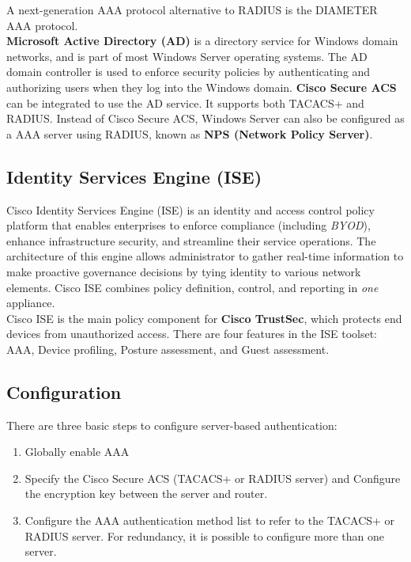 \tableEnd

\note A next-generation AAA protocol alternative to RADIUS is the DIAMETER AAA protocol.\\

\textbf{Microsoft Active Directory (AD)} is a directory service for Windows domain networks, and is part of most Windows Server operating systems. The AD domain controller is used to enforce security policies by authenticating and authorizing users when they log into the Windows domain. \textbf{Cisco Secure ACS} can be integrated to use the AD service. It supports both TACACS+ and RADIUS. Instead of Cisco Secure ACS, Windows Server can also be configured as a AAA server using RADIUS, known as \textbf{NPS (Network Policy Server)}.

\subsection{Identity Services Engine (ISE)}

Cisco Identity Services Engine (ISE) is an identity and access control policy platform that enables enterprises to enforce compliance (including \emph{BYOD}), enhance infrastructure security, and streamline their service operations. The architecture of this engine allows administrator to gather real-time information to make proactive governance decisions by tying identity to various network elements. Cisco ISE combines policy definition, control, and reporting in \emph{one} appliance.\\

Cisco ISE is the main policy component for \textbf{Cisco TrustSec}, which protects end devices from unauthorized access. There are four features in the ISE toolset: AAA, Device profiling, Posture assessment, and Guest assessment.

\subsection{Configuration}

There are three basic steps to configure server-based authentication:

\begin{enumerate}
\item Globally enable AAA
\item Specify the Cisco Secure ACS (TACACS+ or RADIUS server) and Configure the encryption key between the server and router.
\item Configure the AAA authentication method list to refer to the TACACS+ or RADIUS server. For redundancy, it is possible to configure more than one server.
\end{enumerate}


